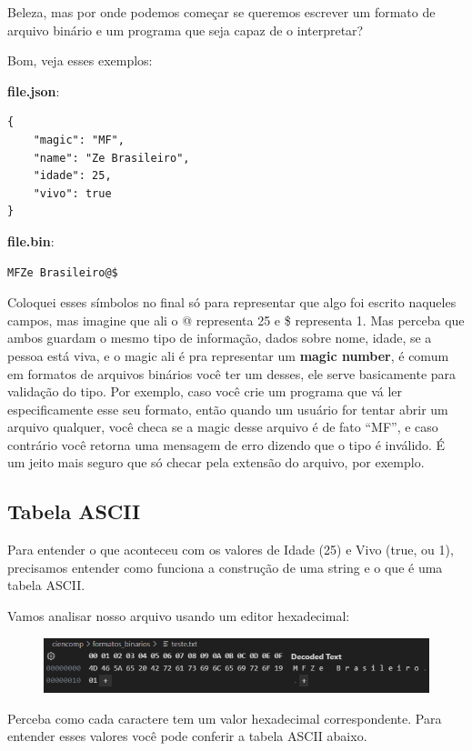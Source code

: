 \documentclass[a4paper,oneside,12pt]{article}
\begin{document}
Beleza, mas por onde podemos começar se queremos escrever um formato de arquivo binário e um programa que seja capaz de o interpretar?

Bom, veja esses exemplos:

\noindent
\textbf{file.json}:
\begin{lstlisting}
{
    "magic": "MF",
    "name": "Ze Brasileiro",
    "idade": 25,
    "vivo": true
}
\end{lstlisting}

\noindent
\textbf{file.bin}:
\begin{lstlisting}
MFZe Brasileiro@$
\end{lstlisting}

Coloquei esses símbolos no final só para representar que algo foi escrito naqueles campos, mas imagine que ali o @ representa 25 e \$ representa 1. Mas perceba que ambos guardam o mesmo tipo de informação, dados sobre nome, idade, se a pessoa está viva, e o magic ali é pra representar um \textbf{magic number}, é comum em formatos de arquivos binários você ter um desses, ele serve basicamente para validação do tipo. Por exemplo, caso você crie um programa que vá ler especificamente esse seu formato, então quando um usuário for tentar abrir um arquivo qualquer, você checa se a magic desse arquivo é de fato ``MF'', e caso contrário você retorna uma mensagem de erro dizendo que o tipo é inválido. É um jeito mais seguro que só checar pela extensão do arquivo, por exemplo.

\subsection{Tabela ASCII}

Para entender o que aconteceu com os valores de Idade (25) e Vivo (true, ou 1), precisamos entender como funciona a construção de uma string e o que é uma tabela ASCII.

Vamos analisar nosso arquivo usando um editor hexadecimal:

\begin{figure}[h]
    \centering
    \includegraphics[width=\linewidth]{hex.png}
\end{figure}

Perceba como cada caractere tem um valor hexadecimal correspondente. Para entender esses valores você pode conferir a tabela ASCII abaixo.
\end{document}
